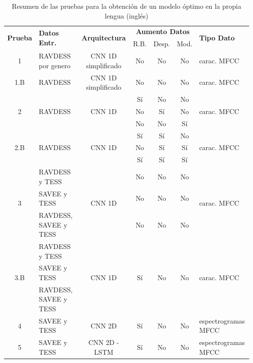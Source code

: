 \documentclass[11pt,a4paper,spanish]{book}
\begin{document}
	\begin{table}[H]
	\centering
	\begin{center}
		\begin{tabular}{| c | p{3.5cm} | c | c c c | p{3.5cm} |}
			\hline
			\multirow{2}{*}{\textbf{Prueba}} &\multirow{2}{*}{\textbf{Datos Entr.}}& \multirow{2}{*}{\textbf{Arquitectura}} & 
			\multicolumn{3}{|c|}{\textbf{Aumento Datos}} & 
			\multirow{2}{*}{\textbf{Tipo Dato}} \\ \cline{4-6}
			& & & R.B. & Desp. & Mod. & \\ 
			\hline \hline
			
			1 & RAVDESS por genero & CNN 1D simplificado & No &No &No & carac. MFCC	\\ \hline
			1.B & RAVDESS & CNN 1D simplificado &No &No &No & carac. MFCC\\ \hline
			\multirow{3}{*}{2} & \multirow{3}{*}{RAVDESS} & \multirow{3}{*}{CNN 1D} &Sí &No &No  & \multirow{3}{*}{carac. MFCC}\\
			& & & No &Sí &No & 	\\
			& & & No &No &Sí  & 	\\ \hline
			
			\multirow{3}{*}{2.B} & \multirow{3}{*}{RAVDESS} & \multirow{3}{*}{CNN 1D } & Sí &Sí &No & \multirow{3}{*}{carac. MFCC}\\
			
			& &  & No &Sí &Sí & \\
			& &  & Sí &Sí &Sí& \\ \hline
			
			\multirow{3}{*}{3} & RAVDESS y TESS & \multirow{3}{*}{CNN 1D} &  No &No &No & \multirow{3}{*}{carac. MFCC}	\\ 
			\cline{2-2}
			& SAVEE y TESS &  &  No &No &No & 	\\
			\cline{2-2}
			& RAVDESS, SAVEE y TESS &  &  No &No &No & 	\\ \hline
			
			\multirow{3}{*}{3.B} & RAVDESS y TESS & \multirow{3}{*}{CNN 1D} & \multirow{3}{*}{ Sí}&\multirow{3}{*}{ No} & \multirow{3}{*}{ No} & \multirow{3}{*}{carac. MFCC}	\\
			& SAVEE y TESS &  & &&  & 	\\
			& RAVDESS, SAVEE y TESS &  & &&  & 	\\\hline
			
			4 & SAVEE y TESS & CNN 2D &Sí &No &No & espectrogramas MFCC\\ \hline
			5 & SAVEE y TESS & CNN 2D - LSTM &Sí &No &No & espectrogramas MFCC\\ \hline
			
		\end{tabular}
		
		\caption{Resumen de las pruebas para la obtención de un modelo óptimo en la propia lengua (inglés)}
		\label{}
	\end{center}
\end{table}
\end{document}
